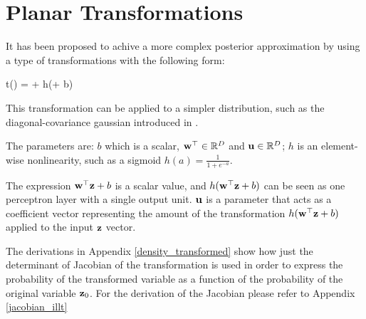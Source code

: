 \section{Planar Transformations}
\label{iltt}

It has been proposed\cite{1505.05770} to achive a more complex 
posterior approximation
by using a type of transformations with the following form:

\begin{nalign}
t(\boldz) = \boldz + \boldu h(\wt \boldz + b)
\end{nalign}

This transformation can be applied to a simpler distribution,
such as the diagonal-covariance gaussian
introduced in \cite{1312.6114}.

The parameters are: $b$ which is a scalar, 
${\mathbf{w}}^{\top} \in \mathbb{R}^D$ and $\mathbf{u} \in \mathbb{R}^D$;
$h$ is an element-wise nonlinearity,
such as a sigmoid $h(a) = \frac{1}{1+e^{-a}}$.


The expression ${\mathbf{w}}^{\top} \mathbf{z} + b$ is a scalar value,
and $h({\mathbf{w}}^{\top} \mathbf{z} + b)$ can be seen as one perceptron layer
with a single output unit. 
$\mathbf{u}$ is a parameter that acts as a coefficient vector
representing the amount of the transformation $h({\mathbf{w}}^{\top} \mathbf{z} + b)$
applied to the input $\mathbf{z}$ vector.

The derivations in Appendix \ref{density_transformed} show how just the 
determinant of Jacobian of the transformation
is used in order to express the probability of the transformed variable
as a function of the probability of the original variable $\mathbf{z}_0$.
For the derivation of the Jacobian please refer to Appendix \ref{jacobian_illt}
